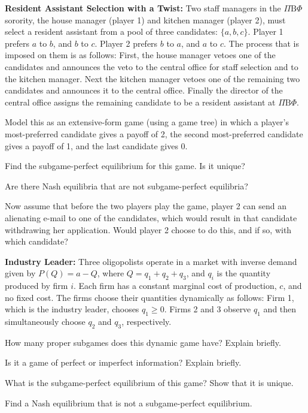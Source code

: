 \textbf{Resident Assistant Selection with a Twist:} Two staff managers in the
$\Pi\mathrm{B}\Phi$ sorority, the house manager (player 1) and kitchen manager (player 2), must
select a resident assistant from a pool of three candidates: $\{a, b, c\}$. Player 1 prefers $a$ to
$b$, and $b$ to $c$. Player 2 prefers $b$ to $a$, and $a$ to $c$. The process that is imposed on them
is as follows: First, the house manager vetoes one of the candidates and announces the veto to the
central office for staff selection and to the kitchen manager. Next the kitchen manager vetoes one
of the remaining two candidates and announces it to the central office. Finally the director of the
central office assigns the remaining candidate to be a resident assistant at $\Pi\mathrm{B}\Phi$.
\begin{partes}
\item Model this as an extensive-form game (using a game tree) in which a player's most-preferred
candidate gives a payoff of 2, the second most-preferred candidate gives a payoff of 1, and the last
candidate gives 0.
\item Find the subgame-perfect equilibrium for this game. Is it unique?
\item Are there Nash equilibria that are not subgame-perfect equilibria?
\item Now assume that before the two players play the game, player 2 can send an alienating e-mail
to one of the candidates, which would result in that candidate withdrawing her application. Would
player 2 choose to do this, and if so, with which candidate?
\end{partes}
\resolespaco


\textbf{Industry Leader:} Three oligopolists operate in a market with inverse demand given
by $P(Q) = a - Q$, where $Q = q_1 + q_2 + q_3$, and $q_i$ is the quantity produced by firm $i$. Each
firm has a constant marginal cost of production, $c$, and no fixed cost. The firms choose their
quantities dynamically as follows: Firm 1, which is the industry leader, chooses $q_1 \ge 0$. Firms
2 and 3 observe $q_1$ and then simultaneously choose $q_2$ and $q_3$, respectively.
\begin{partes}
\item How many proper subgames does this dynamic game have? Explain briefly.
\item Is it a game of perfect or imperfect information? Explain briefly.
\item What is the subgame-perfect equilibrium of this game? Show that it is unique.
\item Find a Nash equilibrium that is not a subgame-perfect equilibrium.
\end{partes}
\resolespaco

